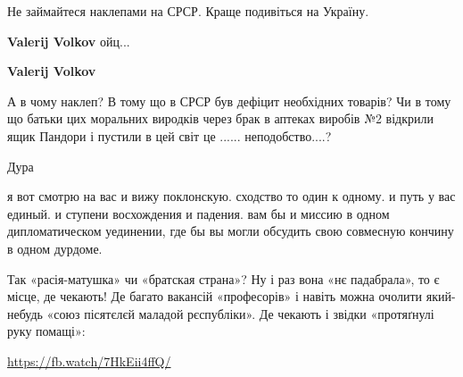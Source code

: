 \begin{itemize}
\begin{itemize}
Не займайтеся наклепами на СРСР.
Краще подивіться на Україну.

 
\textbf{Valerij Volkov} ойц...

 
\textbf{Valerij Volkov} 

А в чому наклеп? В тому що в СРСР був дефіцит необхідних
товарів? Чи в тому що батьки цих моральних виродків через брак в аптеках виробів
№2 відкрили ящик Пандори і пустили в цей світ це ...... неподобство....?


 
Дура
\end{itemize}


я вот смотрю на вас и вижу поклонскую. сходство то один к одному. и путь у вас
единый. и ступени восхождения и падения. вам бы и миссию в одном
дипломатическом уединении, где бы вы могли обсудить свою совмесную кончину в
одном дурдоме.

 

Так «расія-матушка» чи «братская страна»? Ну і раз вона «нє падабрала», то є
місце, де чекають! Де багато вакансій «професорів» і навіть можна очолити
який-небудь «союз пісятєлєй маладой рєспубліки». Де чекають і звідки
«протяґнулі руку помащі»:

\url{https://fb.watch/7HkEii4ffQ/}

\end{itemize}

